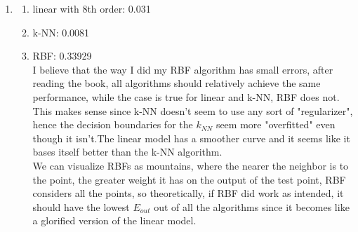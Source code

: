 \documentclass{article}
\begin{document}
\begin{enumerate}
        \item \begin{enumerate}[label=(\roman*)]
            \item linear with 8th order: 0.031
            \item k-NN: 0.0081
            \item RBF: 0.33929\\
            I believe that the way I did my RBF algorithm has small errors, after reading the book, all algorithms should relatively achieve the same performance, while the case is true for linear and k-NN, RBF does not. This makes sense since k-NN doesn't seem to use any sort of "regularizer", hence the decision boundaries for the $k_{NN}$ seem more "overfitted" even though it isn't.The linear model has a smoother curve and it seems like it bases itself better than the k-NN algorithm. \\
            We can visualize RBFs as mountains, where the nearer the neighbor is to the point, the greater weight it has on the output of the test point, RBF considers all the points, so theoretically, if RBF did work as intended, it should have the lowest $E_{out}$ out of all the algorithms since it becomes like a glorified version of the linear model.
        \end{enumerate}
    \end{enumerate}
\end{document}

